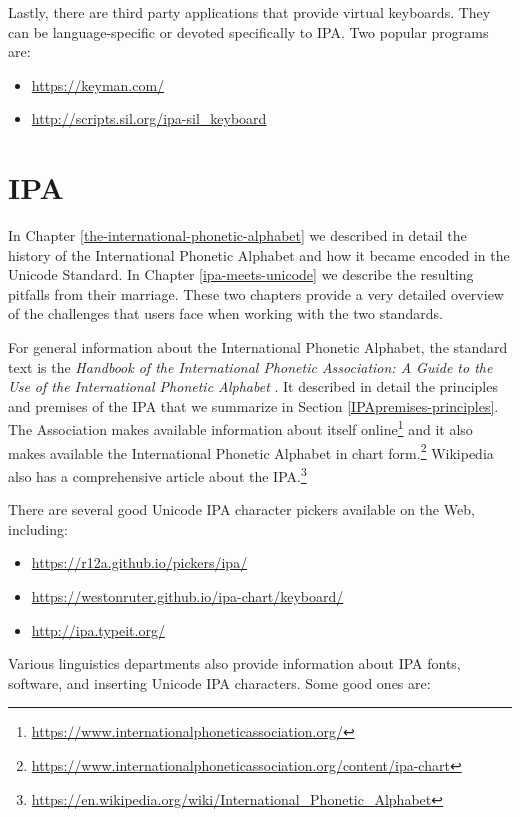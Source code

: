 Lastly, there are third party applications that provide virtual keyboards. They can be language-specific or devoted specifically to IPA. Two popular programs are:

\begin{itemize}
	\item \url{https://keyman.com/}
	\item \url{http://scripts.sil.org/ipa-sil_keyboard}
\end{itemize}



\section{IPA}
In Chapter \ref{the-international-phonetic-alphabet} we described in detail the history of the International Phonetic Alphabet and how it became encoded in the Unicode Standard. In Chapter \ref{ipa-meets-unicode} we describe the resulting pitfalls from their marriage. These two chapters provide a very detailed overview of the challenges that users face when working with the two standards.

For general information about the International Phonetic Alphabet, the standard text is the \textit{Handbook of the International Phonetic Association: A Guide to the Use of the International Phonetic Alphabet} \cite{IPA2007}. It described in detail the principles and premises of the IPA that we summarize in Section \ref{IPApremises-principles}. The Association makes available information about itself  online\footnote{\url{https://www.internationalphoneticassociation.org/}} and it also makes available the International Phonetic Alphabet in chart form.\footnote{\url{https://www.internationalphoneticassociation.org/content/ipa-chart}} Wikipedia also has a comprehensive article about the IPA.\footnote{\url{https://en.wikipedia.org/wiki/International_Phonetic_Alphabet}}

There are several good Unicode IPA character pickers available on the Web, including:

\begin{itemize}
	\item \url{https://r12a.github.io/pickers/ipa/}
	\item \url{https://westonruter.github.io/ipa-chart/keyboard/}
	\item \url{http://ipa.typeit.org/}
\end{itemize}

\noindent Various linguistics departments also provide information about IPA fonts, software, and inserting Unicode IPA characters. Some good ones are:

